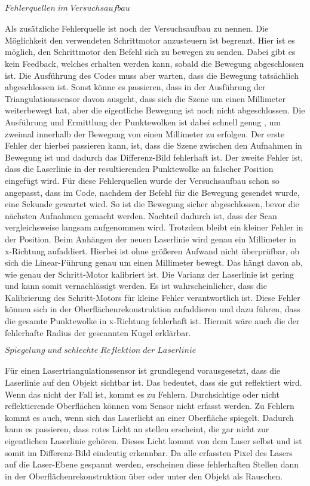 		$\underline{Fehlerquellen \; im \; Versuchsaufbau}$
		
		Als zusätzliche Fehlerquelle ist noch der Versuchsaufbau zu nennen. Die Möglichkeit den verwendeten Schrittmotor anzusteuern ist begrenzt. Hier ist es möglich, den Schrittmotor den Befehl sich zu bewegen zu senden. Dabei gibt es kein Feedback, welches erhalten werden kann, sobald die Bewegung abgeschlossen ist. Die Ausführung des Codes muss aber warten, dass die Bewegung tatsächlich abgeschlossen ist. Sonst könne es passieren, dass in der Ausführung der Triangulationssensor davon ausgeht, dass sich die Szene um einen Millimeter weiterbewegt hat, aber die eigentliche Bewegung ist noch nicht abgeschlossen. Die Ausführung und Ermittlung der Punktewolken ist dabei schnell genug , um zweimal innerhalb der Bewegung von einen Millimeter zu erfolgen. Der erste Fehler der hierbei passieren kann, ist, dass die Szene zwischen den Aufnahmen in Bewegung ist und dadurch das Differenz-Bild fehlerhaft ist. Der zweite Fehler ist, dass die Laserlinie in der resultierenden Punktewolke an falscher Position eingefügt wird. Für diese Fehlerquellen wurde der Versuchsaufbau schon so angepasst, dass im Code, nachdem der Befehl für die Bewegung gesendet wurde, eine Sekunde gewartet wird. So ist die Bewegung sicher abgeschlossen, bevor die nächsten Aufnahmen gemacht werden. Nachteil dadurch ist, dass der Scan vergleichsweise langsam aufgenommen wird. Trotzdem bleibt ein kleiner Fehler in der Position. Beim Anhängen der neuen Laserlinie wird genau ein Millimeter in x-Richtung aufaddiert. Hierbei ist ohne größeren Aufwand nicht überprüfbar, ob sich die Linear-Führung genau um einen Millimeter bewegt. Das hängt davon ab, wie genau der Schritt-Motor kalibriert ist. Die Varianz der Laserlinie ist gering und kann somit vernachlässigt werden. Es ist wahrscheinlicher, dass die Kalibrierung des Schritt-Motors für kleine Fehler verantwortlich ist. Diese Fehler können sich in der Oberflächenrekonstruktion aufaddieren und dazu führen, dass die gesamte Punktewolke in x-Richtung fehlerhaft ist. Hiermit wäre auch die der fehlerhafte Radius der gescannten Kugel erklärbar.
		
		$\underline{Spiegelung \; und \; schlechte \; Reflektion \; der \; Laserlinie}$
		
		Für einen Lasertriangulationssensor ist grundlegend vorausgesetzt, dass die Laserlinie auf den Objekt sichtbar ist. Das bedeutet, dass sie gut reflektiert wird. Wenn das nicht der Fall ist, kommt es zu Fehlern. Durchsichtige oder nicht reflektierende Oberflächen können vom Sensor nicht erfasst werden. Zu Fehlern kommt es auch, wenn sich das Laserlicht an einer Oberfläche spiegelt. Dadurch kann es passieren, dass rotes Licht an stellen erscheint, die gar nicht zur eigentlichen Laserlinie gehören. Dieses Licht kommt von dem Laser selbst und ist somit im Differenz-Bild eindeutig erkennbar. Da alle erfassten Pixel des Lasers auf die Laser-Ebene gespannt werden, erscheinen diese fehlerhaften Stellen dann in der Oberflächenrekonstruktion über oder unter den Objekt als Rauschen. 
